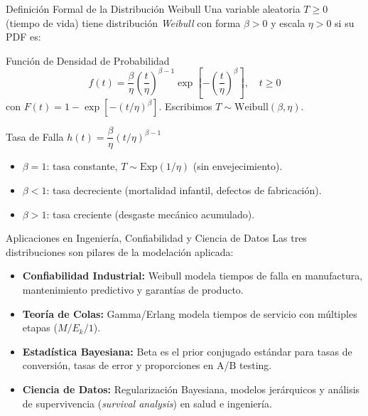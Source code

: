 \documentclass[10pt, aspectratio=169]{beamer}
\begin{document}
\begin{frame}{Definición Formal de la Distribución Weibull}
  \footnotesize
  Una variable aleatoria $T \geq 0$ (tiempo de vida) tiene distribución \emph{Weibull} con forma $\beta > 0$ y escala $\eta > 0$ si su PDF es: \pause

  \vspace{0.1cm}
  \begin{block}{Función de Densidad de Probabilidad}
    $$f(t) = \dfrac{\beta}{\eta}\left(\dfrac{t}{\eta}\right)^{\beta-1}\exp\!\left[-\left(\dfrac{t}{\eta}\right)^{\beta}\right], \quad t \geq 0$$
    con $F(t) = 1-\exp[-(t/\eta)^{\beta}]$. Escribimos $T \sim \text{Weibull}(\beta,\eta)$.
  \end{block}

  \vspace{0.1cm}
  \pause
  \begin{alertblock}{Tasa de Falla $h(t) = \dfrac{\beta}{\eta}(t/\eta)^{\beta-1}$}
    \begin{itemize}\itemsep=0.05cm
      \item $\beta = 1$: tasa constante, $T \sim \text{Exp}(1/\eta)$ (sin envejecimiento).
      \item $\beta < 1$: tasa decreciente (mortalidad infantil, defectos de fabricación).
      \item $\beta > 1$: tasa creciente (desgaste mecánico acumulado).
    \end{itemize}
  \end{alertblock}
\end{frame}

\begin{frame}{Aplicaciones en Ingeniería, Confiabilidad y Ciencia de Datos}
  \footnotesize
  Las tres distribuciones son pilares de la modelación aplicada: \pause

  \vspace{0.15cm}
  \begin{itemize}\itemsep=0.12cm
    \item \textbf{Confiabilidad Industrial:} Weibull modela tiempos de falla en manufactura, mantenimiento predictivo y garantías de producto. \pause
    \item \textbf{Teoría de Colas:} Gamma/Erlang modela tiempos de servicio con múltiples etapas ($M/E_{k}/1$). \pause
    \item \textbf{Estadística Bayesiana:} Beta es el prior conjugado estándar para tasas de conversión, tasas de error y proporciones en A/B testing. \pause
    \item \textbf{Ciencia de Datos:} Regularización Bayesiana, modelos jerárquicos y análisis de supervivencia (\emph{survival analysis}) en salud e ingeniería.
  \end{itemize}
\end{frame}
\end{document}

